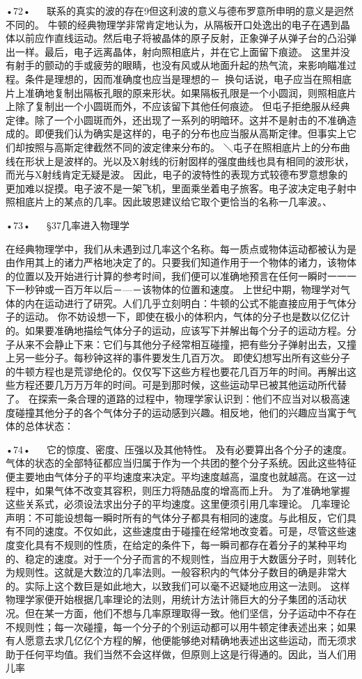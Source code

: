 •72•
  
联系的真实的波的存在9但这利波的意义与德布罗意所申明的意义是迥然不同的。
牛顿的经典物理学非常肯定地认为，从隔板开口处逸出的电子在遇到晶体以前应作直线运动。然后电子将被晶体的原子反射，正象弹子从弹子台的凸沿弹出一样。最后，电子远离晶体，射向照相底片，并在它上面留下痕迹。
这里并没有射手的颤动的手或疲劳的眼睛，也没有风或从地面升起的热气流，来影响瞄准过程。条件是理想的，因而准确度也应当是理想的－~换句话说，电子应当在照相底片上准确地复制出隔板孔眼的原来形状。如果隔板孔限是一个小圆润，则照相底片上除了复制出一个小圆斑而外，不应该留下其他任何痕迹。
但屯子拒绝服从经典定律。除了一个小圆斑而外，还出现了一系列的明暗环。这并不是射击的不准确造成的。即便我们认为确实是这样的，电子的分布也应当服从高斯定律。但事实上它们却按照与高斯定律截然不同的波定律来分布的。
＼屯子在照相底片上的分布曲线在形状上是波样的。光以及X射线的衍射囡样的强度曲线也具有相同的波形状，而光与X射线肯定无疑是波。
因此，电子的波特性的表现方式较德布罗意想象的更加难以捉摸。电子波不是一架飞机，里面乘坐着电子旅客。电子波决定电子射中照相底片上的某点的几率。因此玻恩建议给它取个更恰当的名称一几率波。、

•73•
  
§37几率进入物理学

在经典物理学中，我们从未遇到过几率这个名称。每一质点或物体运动都被认为是由作用其上的诸力严格地决定了的。只要我们知道作用于一个物体的诸力，该物体的位置以及开始进行计算的参考时间，我们便可以准确地预言在任何一瞬时一一一下一秒钟或一百万年以后－—－该物体的位置和速度。
上世纪中期，物理学对气体的内在运动进行了研究。人们几乎立刻明白：牛顿的公式不能直接应用于气体分子的运动。
你不妨设想一下，即使在极小的体积内，气体的分子也是数以亿亿计的。如果要准确地描绘气体分子的运动，应该写下并解出每个分子的运动方程。分子从来不会静止下来：它们与其他分子经常相互碰撞，把有些分子弹射出去，又撞上另一些分子。每秒钟这祥的事件要发生几百万次。
即使幻想写出所有这些分子的牛顿方程也是荒谬绝伦的。仅仅写下这些方程也要花几百万年的时间。再解出这些方程还要几万万万年的时间。可是到那时候，这些运动早已被其他运动所代替了。
在探索一条合理的道路的过程中，物理学家认识到：他们不应当对以极高速度碰撞其他分子的各个气体分子的运动感到兴趣。相反地，他们的兴趣应当寓于气体的总体状态：

•74•
  
它的惊度、密度、压强以及其他特性。
及有必要算出各个分子的速度。气体的状态的全部特征都应当归属于作为一个共团的整个分子系统。因此这些特征便主要地由气体分子的平均速度来决定。平均速度越高，温度也就越高。在这一过程中，如果气体不改变其容积，则压力将随品度的增高而上升。
为了准确地掌握这些关系式，必须设法求出分子的平均速度。这里便须引用几率理论。
几率理论声明：不可能设想每一瞬时所有的气体分子都具有相同的速度。与此相反，它们具有不同的速度。不仅如此，这些速度由于碰撞在经常地改变着。可是，尽管这些速度变化具有不规则的性质，在给定的条件下，每一瞬司都存在着分子的某种平均的、稳定的速度。对于一个分子而言的不规则性，当应用于大数匮分子时，则转化为规则性。这就是大数泣的几率法则。一般容积内的气体分子数目的确是非常大的。实际上这个数巨是如此地大，以致我们可以毫不迟疑地应用这一法则。
这样物理学家便开始根据几率理论的法则，用统计方法计筛巨大的分子集团的活动状况。但在某一方面，他们不想与几率原理取得一致。他们坚信，分子运动中不存在不规则性；每一次碰撞，每一个分子的个别运动都可以用牛顿定律表述出来；如果有人愿意去求几亿亿个方程的解，他便能够绝对精确地表述出这些运动，而无须求助于任何平均值。我们当然不会这样做，但原则上这是行得通的。因此，当人们用儿率

